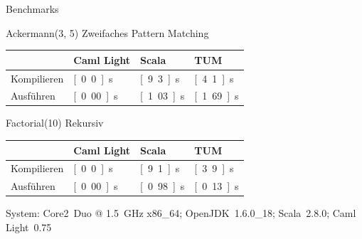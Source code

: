 \documentclass[hyperref={pdfpagelabels=false}]{beamer}
\begin{document}
\begin{frame}{Benchmarks}
  \begin{block}{Ackermann(3, 5)}
    Zweifaches Pattern Matching

    \begin{tabular}{l|l|l|l}
       & Caml Light & Scala & TUM \\
      \hline
      Kompilieren & \textcolor{fastest}{\unit[0.0]{s}} & \textcolor{slowest}{\unit[9.3]{s}} & \unit[4.1]{s} \\
      Ausführen & \textcolor{fastest}{\unit[0.00]{s}} & \unit[1.03]{s} & \textcolor{slowest}{\unit[1.69]{s}} \\
    \end{tabular}
  \end{block}
  \begin{block}{Factorial(10)}
    Rekursiv

    \begin{tabular}{l|l|l|l}
       & Caml Light & Scala & TUM \\
      \hline
      Kompilieren & \textcolor{fastest}{\unit[0.0]{s}} & \textcolor{slowest}{\unit[9.1]{s}} & \unit[3.9]{s} \\
      Ausführen & \textcolor{fastest}{\unit[0.00]{s}} & \textcolor{slowest}{\unit[0.98]{s}} & \unit[0.13]{s} \\
    \end{tabular}
  \end{block}
  System: Core2~Duo @ 1.5~GHz x86\_64; OpenJDK~1.6.0\_18; Scala~2.8.0; Caml Light~0.75
\end{frame}
\end{document}
